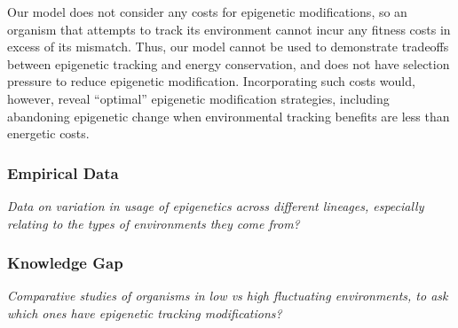 \documentclass{article}
\begin{document}
Our model does not consider any costs for epigenetic modifications, so an organism that attempts to track its environment cannot incur any fitness costs in excess of its mismatch. Thus, our model cannot be used to demonstrate tradeoffs between epigenetic tracking and energy conservation, and does not have selection pressure to reduce epigenetic modification. Incorporating such costs would, however, reveal ``optimal'' epigenetic modification strategies, including abandoning epigenetic change when environmental tracking benefits are less than energetic costs.

\subsubsection{Empirical Data}

\textit{Data on variation in usage of epigenetics across different lineages, especially relating to the types of environments they come from?}

\subsubsection{Knowledge Gap}

\textit{Comparative studies of organisms in low vs high fluctuating environments, to ask which ones have epigenetic tracking modifications?}
\end{document}
